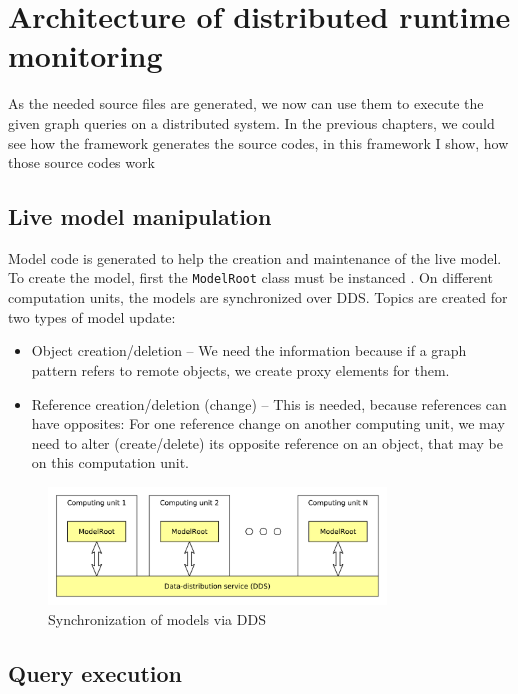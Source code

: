 %
\chapter{Architecture of distributed runtime monitoring}
%

As the needed source files are generated, we now can use them to execute the given graph queries on a distributed system. 
In the previous chapters, we could see how the framework generates the source codes, in this framework I show, how those source codes work



\section{Live model manipulation}
Model code is generated to help the creation and maintenance of the live model.
To create the model, first the \texttt{ModelRoot} class must be instanced .
On different computation units, the models are synchronized over DDS.
Topics are created for two types of model update:
\begin{itemize}
	\item Object creation/deletion -- We need the information because if a graph pattern refers to remote objects, we create proxy elements for them.  
	\item Reference creation/deletion (change) -- This is needed, because references can have opposites: For one reference change on another computing unit, we may need to alter (create/delete) its opposite reference on an object, that may be on this computation unit.
\end{itemize}

\begin{figure}[H]
	\begin{center}
		\includegraphics[width=0.8\textwidth]{figures/model-dds.pdf}
		\caption{ Synchronization of models via DDS }
		\label{fig:model-dds}
	\end{center}
\end{figure}

\section{Query execution}

